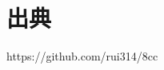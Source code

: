 \documentclass[11pt,a4j]{jarticle}
\begin{document}

\section{出典}


https://github.com/rui314/8cc
\end{document}
